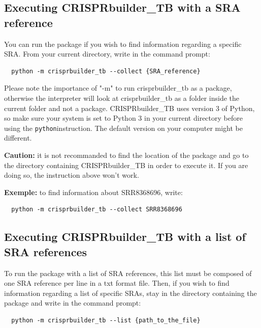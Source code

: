 \documentclass[twoside,a4paper,11pt,frenchb,openany]{report}
\begin{document}
    \subsection{Executing CRISPRbuilder\_TB with a SRA
reference}\label{executing-crisprbuilder_tb-with-a-sra-reference}

    You can run the package if you wish to find information regarding a
specific SRA. From your current directory, write in the command prompt:

    \begin{verbatim}
  python -m crisprbuilder_tb --collect {SRA_reference}
\end{verbatim}

    Please note the importance of "-m" to run crisprbuilder\_tb as a
package, otherwise the interpreter will look at crisprbuilder\_tb as a folder inside the current folder and not a package. CRISPRbuilder\_TB uses version 3 of Python, so make sure your system is set to Python 3 in your current directory before using the
\texttt{python}instruction. The default version on your computer might
be different.

\textbf{Caution:} it is not recommanded to find the location of the
package and go to the directory containing CRISPRbuilder\_TB in order to
execute it. If you are doing so, the instruction above won't work.

    \textbf{Exemple:} to find information about SRR8368696, write:

    \begin{verbatim}
  python -m crisprbuilder_tb --collect SRR8368696
\end{verbatim}


    \subsection{Executing CRISPRbuilder\_TB with a list of SRA
references}\label{executing-crisprbuilder_tb-with-a-list-of-sra-references}

    To run the package with a list of SRA references, this list must be
composed of one SRA reference per line in a txt format file. Then, if
you wish to find information regarding a list of specific SRAs, stay in
the directory containing the package and write in the command prompt:

    \begin{verbatim}
  python -m crisprbuilder_tb --list {path_to_the_file}
\end{verbatim}
\end{document}
